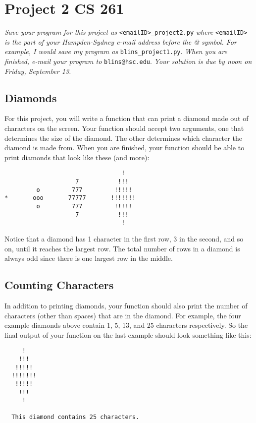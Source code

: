 \documentclass[12pt]{article}
\begin{document}
\section*{Project 2 \hfill CS 261}

\textit{Save your program for this project as} \verb|<emailID>_project2.py| \textit{where} \verb|<emailID>| \textit{is the part of your Hampden-Sydney e-mail address before the @ symbol.  For example, I would save my program as} \verb|blins_project1.py|. \textit{When you are finished, e-mail your program to} \verb|blins@hsc.edu|. \textit{Your solution is due by noon on Friday, September 13. }

\subsection*{Diamonds}

For this project, you will write a function that can print a diamond made out of characters on the screen.  Your function should accept two arguments, one that determines the size of the diamond.  The other determines which character the diamond is made from.  When you are finished, your function should be able to print diamonds that look like these (and more):
\begin{center}
\begin{BVerbatim}
                                 !  
                    7           !!!
         o         777         !!!!!
*       ooo       77777       !!!!!!!
         o         777         !!!!!
                    7           !!!
                                 ! 
\end{BVerbatim}
\end{center}

\noindent 
Notice that a diamond has 1 character in the first row, 3 in the second, and so on, until it reaches the largest row.  The total number of rows in a diamond is always odd since there is one largest row in the middle. 

\subsection*{Counting Characters}

In addition to printing diamonds, your function should also print the number of characters (other than spaces) that are in the diamond.  For example, the four example diamonds above contain 1, 5, 13, and 25 characters respectively.  So the final output of your function on the last example should look something like this: \\

\noindent
\begin{BVerbatim}
     !  
    !!!
   !!!!!
  !!!!!!!
   !!!!!
    !!!
     ! 

  This diamond contains 25 characters. 

\end{BVerbatim}
\end{document}
